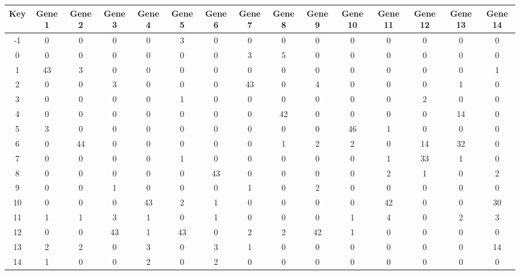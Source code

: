 \begin{tabular}{|c|c|c|c|c|c|c|c|c|c|c|c|c|c|c|}
\hline
Key & Gene 1 & Gene 2 & Gene 3 & Gene 4 & Gene 5 & Gene 6 & Gene 7 & Gene 8 & Gene 9 & Gene 10 & Gene 11 & Gene 12 & Gene 13 & Gene 14 \\
\hline
-1 & 0 & 0 & 0 & 0 & 3 & 0 & 0 & 0 & 0 & 0 & 0 & 0 & 0 & 0 \\
0 & 0 & 0 & 0 & 0 & 0 & 0 & 3 & 5 & 0 & 0 & 0 & 0 & 0 & 0 \\
1 & 43 & 3 & 0 & 0 & 0 & 0 & 0 & 0 & 0 & 0 & 0 & 0 & 0 & 1 \\
2 & 0 & 0 & 3 & 0 & 0 & 0 & 43 & 0 & 4 & 0 & 0 & 0 & 1 & 0 \\
3 & 0 & 0 & 0 & 0 & 1 & 0 & 0 & 0 & 0 & 0 & 0 & 2 & 0 & 0 \\
4 & 0 & 0 & 0 & 0 & 0 & 0 & 0 & 42 & 0 & 0 & 0 & 0 & 14 & 0 \\
5 & 3 & 0 & 0 & 0 & 0 & 0 & 0 & 0 & 0 & 46 & 1 & 0 & 0 & 0 \\
6 & 0 & 44 & 0 & 0 & 0 & 0 & 0 & 1 & 2 & 2 & 0 & 14 & 32 & 0 \\
7 & 0 & 0 & 0 & 0 & 1 & 0 & 0 & 0 & 0 & 0 & 1 & 33 & 1 & 0 \\
8 & 0 & 0 & 0 & 0 & 0 & 43 & 0 & 0 & 0 & 0 & 2 & 1 & 0 & 2 \\
9 & 0 & 0 & 1 & 0 & 0 & 0 & 1 & 0 & 2 & 0 & 0 & 0 & 0 & 0 \\
10 & 0 & 0 & 0 & 43 & 2 & 1 & 0 & 0 & 0 & 0 & 42 & 0 & 0 & 30 \\
11 & 1 & 1 & 3 & 1 & 0 & 1 & 0 & 0 & 0 & 1 & 4 & 0 & 2 & 3 \\
12 & 0 & 0 & 43 & 1 & 43 & 0 & 2 & 2 & 42 & 1 & 0 & 0 & 0 & 0 \\
13 & 2 & 2 & 0 & 3 & 0 & 3 & 1 & 0 & 0 & 0 & 0 & 0 & 0 & 14 \\
14 & 1 & 0 & 0 & 2 & 0 & 2 & 0 & 0 & 0 & 0 & 0 & 0 & 0 & 0 \\
\hline
\end{tabular}